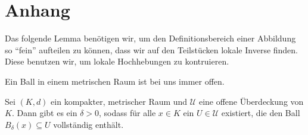 \section{Anhang}

Das folgende Lemma benötigen wir, um den Definitionsbereich einer Abbildung so \enquote{fein} aufteilen zu können, dass wir auf den Teilstücken lokale Inverse finden. Diese benutzen wir, um lokale Hochhebungen zu kontruieren.
\begin{convention}
	Ein Ball in einem metrischen Raum ist bei uns immer offen.
\end{convention}
\begin{lemma} [Lebesgue] \label{lemma_lebesgue_number}
	Sei \((K,d)\) ein kompakter, metrischer Raum und \(\mathcal{U}\) eine offene Überdeckung von \(K.\) 
	Dann gibt es ein \(\delta > 0\), sodass für alle \(x\in K\) ein \(U\in\mathcal{U}\) existiert, die den Ball \(B_{\delta} (x) \subseteq U\) vollständig enthält.

\end{lemma}
